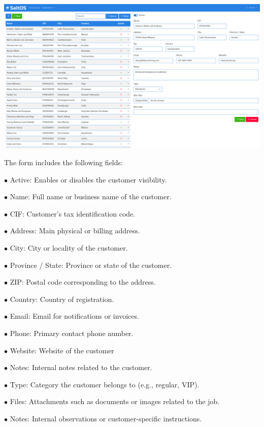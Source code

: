 \documentclass[a4paper]{article}
\begin{document}
\begin{center}\includegraphics[width=1\textwidth]{../ujest/snaps/test-screenshots-js-screenshots-crm-customers-edit-100-en-us-1-snap.png}\end{center}

The form includes the following fields:

\begin{compactitem}
\item[\color{myblue}$\bullet$] Active: Enables or disables the customer visibility.
\item[\color{myblue}$\bullet$] Name: Full name or business name of the customer.
\item[\color{myblue}$\bullet$] CIF: Customer's tax identification code.
\item[\color{myblue}$\bullet$] Address: Main physical or billing address.
\item[\color{myblue}$\bullet$] City: City or locality of the customer.
\item[\color{myblue}$\bullet$] Province / State: Province or state of the customer.
\item[\color{myblue}$\bullet$] ZIP: Postal code corresponding to the address.
\item[\color{myblue}$\bullet$] Country: Country of registration.
\item[\color{myblue}$\bullet$] Email: Email for notifications or invoices.
\item[\color{myblue}$\bullet$] Phone: Primary contact phone number.
\item[\color{myblue}$\bullet$] Website: Website of the customer
\item[\color{myblue}$\bullet$] Notes: Internal notes related to the customer.
\item[\color{myblue}$\bullet$] Type: Category the customer belongs to (e.g., regular, VIP).
\item[\color{myblue}$\bullet$] Files: Attachments such as documents or images related to the job.
\item[\color{myblue}$\bullet$] Notes: Internal observations or customer-specific instructions.
\end{compactitem}
\end{document}
